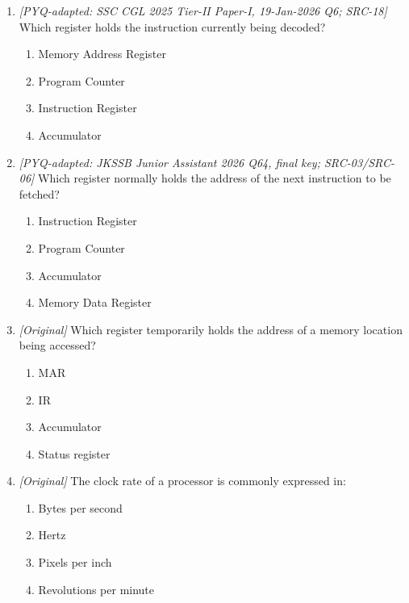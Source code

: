 \begin{enumerate}[label=\textbf{Q\arabic*.}, leftmargin=*]
\begin{enumerate}[label=\Alph*.]
    \item The ALU carries out arithmetic and logical operations.
    \item The Control Unit stores user files permanently.
  \end{enumerate}
\item \textit{[PYQ-adapted: SSC CGL 2025 Tier-II Paper-I, 19-Jan-2026 Q6; SRC-18]} Which register holds the instruction currently being decoded?
  \begin{enumerate}[label=\Alph*.]
\item Memory Address Register
   \item Program Counter
   \item Instruction Register
   \item Accumulator
  \end{enumerate}

\item \textit{[PYQ-adapted: JKSSB Junior Assistant 2026 Q64, final key; SRC-03/SRC-06]} Which register normally holds the address of the next instruction to be fetched?
  \begin{enumerate}[label=\Alph*.]
\item Instruction Register
   \item Program Counter
   \item Accumulator
   \item Memory Data Register
  \end{enumerate}

\item \textit{[Original]} Which register temporarily holds the address of a memory location being accessed?
  \begin{enumerate}[label=\Alph*.]
\item MAR
   \item IR
   \item Accumulator
   \item Status register
  \end{enumerate}

\item \textit{[Original]} The clock rate of a processor is commonly expressed in:
  \begin{enumerate}[label=\Alph*.]
\item Bytes per second
   \item Hertz
   \item Pixels per inch
   \item Revolutions per minute
  \end{enumerate}


\end{enumerate}
